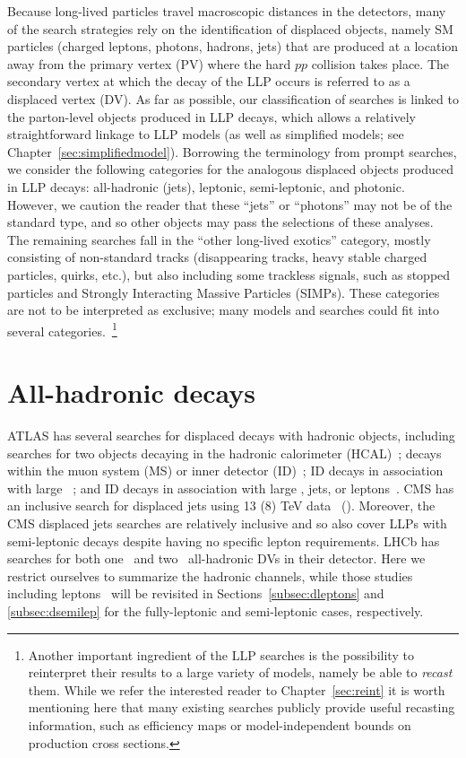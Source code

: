 Because long-lived particles travel macroscopic distances in the detectors, many of the search strategies rely on the identification of displaced objects, namely SM particles (charged leptons, photons, hadrons, jets) that are produced at a location away from the primary vertex (PV) where the hard $pp$ collision takes place. The secondary vertex at which the decay of the LLP occurs is referred to as a displaced vertex (DV). As far as possible, our classification of searches is linked to the parton-level objects produced in LLP decays, which allows a relatively straightforward linkage to LLP models (as well as simplified models; see Chapter~\ref{sec:simplifiedmodel}). Borrowing the terminology from prompt searches, we  consider the following categories for the analogous displaced objects produced in LLP decays: all-hadronic (jets), leptonic, semi-leptonic, and photonic. However, we caution the reader that these ``jets'' or ``photons'' may not be of the standard type, and so other objects may pass the selections of these analyses. The remaining searches  fall in the ``other long-lived exotics'' category, mostly consisting of non-standard tracks (disappearing tracks,  heavy stable charged particles, quirks, etc.), but also including some trackless signals, such as stopped particles and Strongly Interacting Massive Particles (SIMPs). These categories are not to be interpreted as exclusive; many models and searches could fit into several categories.~\footnote{Another important ingredient of the LLP searches is the possibility to reinterpret their results to a large variety of models, namely be able to \emph{recast} them. While we refer the interested reader to Chapter~\ref{sec:reint} it is worth mentioning here that many existing searches publicly provide useful recasting information, such as efficiency maps or model-independent bounds on production cross sections.}

\section{All-hadronic decays}
\label{subsec:djets}

ATLAS has several searches for displaced decays with hadronic objects, including searches for two objects decaying in the hadronic calorimeter (HCAL)~\cite{ATLAS-CONF-2016-103,CalRatio8TeV}; decays within the muon system (MS) or inner detector (ID)~\cite{Aad:2015uaa}; ID decays in association with large \met~\cite{Aaboud:2017iio}; and ID decays in association with large \met, jets, or leptons~\cite{Aad:2015rba}.  CMS has an inclusive search for displaced jets using 13 (8) TeV data~\cite{Sirunyan:2017jdo} (\cite{CMS:2014wda}). Moreover, the CMS displaced jets searches are relatively inclusive and so also cover LLPs with semi-leptonic decays despite having no specific lepton requirements. LHCb has searches for both one~\cite{Aaij:2017mic} and two~\cite{Aaij:2016isa} all-hadronic DVs in their detector. Here we restrict ourselves to summarize the hadronic channels, while those studies including leptons~\cite{Aad:2015rba,Sirunyan:2017jdo} will be revisited in Sections~\ref{subsec:dleptons} and \ref{subsec:dsemilep} for the fully-leptonic and semi-leptonic cases, respectively.

